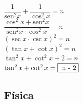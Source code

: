 \begin{enumerate}
	$\dfrac{1}{\text{sen}^2 x} + \dfrac{1}{\cos^2 x} = n$\\
	
	$\dfrac{\cos^2 x + \text{sen}^2 x}{\text{sen}^2 x \cdot \cos^2 x} = n$\\
	
	$(\sec x \cdot \csc x)^2 = n$\\
	$(\tan x + \cot x)^2 = n$\\
	$\tan^2 x + \cot^2 x + 2 = n$\\
	$\tan^2 x + \cot^2 x = \fbox{ n - 2}$
	
	\vspace{6mm}
	
\end{enumerate}








\subsection*{Física}

